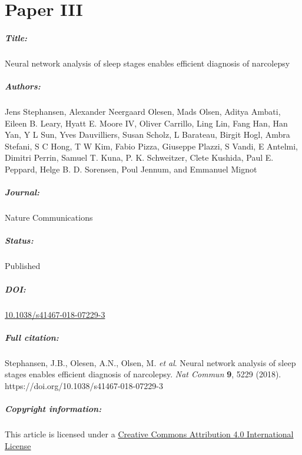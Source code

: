 \chapter{Paper III}

\paragraph{Title:}
Neural network analysis of sleep stages enables efficient diagnosis of narcolepsy

\paragraph{Authors:}
Jens Stephansen, Alexander Neergaard Olesen, Mads Olsen, Aditya Ambati, Eileen B. Leary, Hyatt E. Moore IV, Oliver Carrillo, Ling Lin, Fang Han, Han Yan, Y L Sun, Yves Dauvilliers, Susan Scholz, L Barateau, Birgit Hogl, Ambra Stefani, S C Hong, T W Kim, Fabio Pizza, Giuseppe Plazzi, S Vandi, E Antelmi, Dimitri Perrin, Samuel T. Kuna, P. K. Schweitzer, Clete Kushida, Paul E. Peppard, Helge B. D. Sorensen, Poul Jennum, and Emmanuel Mignot

\paragraph{Journal:}
Nature Communications

\paragraph{Status:}
Published

\paragraph{DOI:}
\href{https://doi.org/10.1038/s41467-018-07229-3}{10.1038/s41467-018-07229-3}

\paragraph{Full citation:}
Stephansen, J.B., Olesen, A.N., Olsen, M. \textit{et al}. Neural network analysis of sleep stages enables efficient diagnosis of narcolepsy. \textit{Nat Commun} \textbf{9}, 5229 (2018). https://doi.org/10.1038/s41467-018-07229-3

\paragraph{Copyright information:}
 This article is licensed under a \href{http://creativecommons.org/licenses/by/4.0/}{Creative Commons Attribution 4.0 International License}



